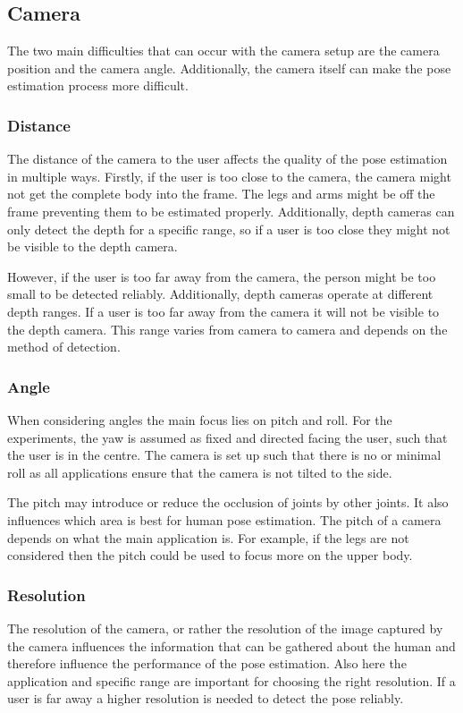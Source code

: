 \subsection{Camera}
\label{sec:camera}

The two main difficulties that can occur with the camera setup are the camera position and the camera angle. Additionally, the camera itself can make the pose estimation process more difficult. 

\subsubsection{Distance}

The distance of the camera to the user affects the quality of the pose estimation in multiple ways. Firstly, if the user is too close to the camera, the camera might not get the complete body into the frame. The legs and arms might be off the frame preventing them to be estimated properly. Additionally, depth cameras can only detect the depth for a specific range, so if a user is too close they might not be visible to the depth camera.

However, if the user is too far away from the camera, the person might be too small to be detected reliably. Additionally, depth cameras operate at different depth ranges. If a user is too far away from the camera it will not be visible to the depth camera. This range varies from camera to camera and depends on the method of detection.

\subsubsection{Angle}

When considering angles the main focus lies on pitch and roll. For the experiments, the yaw is assumed as fixed and directed facing the user, such that the user is in the centre. The camera is set up such that there is no or minimal roll as all applications ensure that the camera is not tilted to the side.

The pitch may introduce or reduce the occlusion of joints by other joints. It also influences which area is best for human pose estimation. The pitch of a camera depends on what the main application is. For example, if the legs are not considered then the pitch could be used to focus more on the upper body.

\subsubsection{Resolution}

The resolution of the camera, or rather the resolution of the image captured by the camera influences the information that can be gathered about the human and therefore influence the performance of the pose estimation. Also here the application and specific range are important for choosing the right resolution. If a user is far away a higher resolution is needed to detect the pose reliably.
